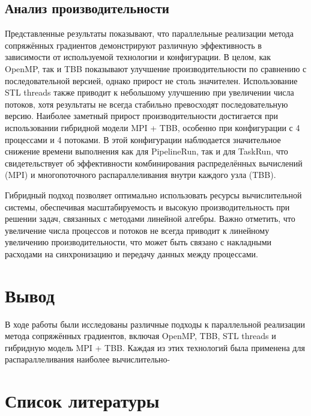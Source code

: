 \documentclass[12pt]{article}
\begin{document}
\subsection{Анализ производительности}
\hspace*{1.35em}Представленные результаты показывают, что параллельные реализации метода сопряжённых градиентов демонстрируют различную эффективность в зависимости от используемой технологии и конфигурации.
В целом, как OpenMP, так и TBB показывают улучшение производительности по сравнению с последовательной версией, однако прирост не столь значителен. Использование STL threads также приводит к небольшому улучшению при увеличении числа потоков, хотя результаты не всегда стабильно превосходят последовательную версию.
Наиболее заметный прирост производительности достигается при использовании гибридной модели MPI + TBB, особенно при конфигурации с 4 процессами и 4 потоками. 
В этой конфигурации наблюдается значительное снижение времени выполнения как для PipelineRun, так и для TaskRun, что свидетельствует об эффективности комбинирования распределённых вычислений (MPI) и многопоточного распараллеливания внутри каждого узла (TBB). 

Гибридный подход позволяет оптимально использовать ресурсы вычислительной системы, обеспечивая масштабируемость и высокую производительность при решении задач, связанных с методами линейной алгебры. Важно отметить, что увеличение числа процессов и потоков не всегда приводит к линейному увеличению производительности,
что может быть связано с накладными расходами на синхронизацию и передачу данных между процессами.

\section{Вывод}
\hspace*{1.35em}В ходе работы были исследованы различные подходы к параллельной реализации метода сопряжённых градиентов, включая OpenMP, TBB, STL threads и гибридную модель MPI + TBB. Каждая из этих технологий была применена для распараллеливания наиболее вычислительно-

\section{Список литературы}
\end{document}
